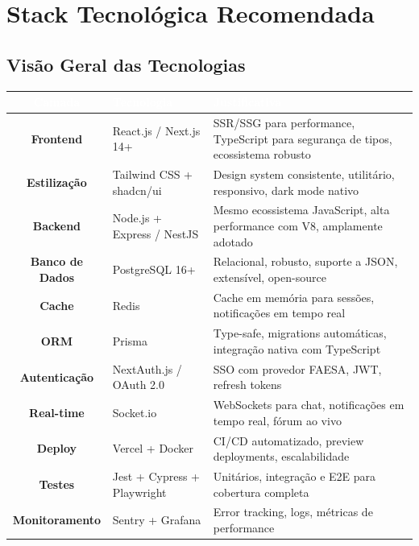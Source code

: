 \documentclass[12pt, a4paper]{article}
\begin{document}
\newpage
\section{Stack Tecnológica Recomendada}

\subsection{Visão Geral das Tecnologias}

\begin{center}
\begin{tabularx}{\textwidth}{|c|X|X|}
\hline
\rowcolor{faesaAzul}
\textcolor{white}{\textbf{Camada}} & \textcolor{white}{\textbf{Tecnologia}} & \textcolor{white}{\textbf{Justificativa}} \\
\hline
\textbf{Frontend} & React.js / Next.js 14+ & SSR/SSG para performance, TypeScript para segurança de tipos, ecossistema robusto \\
\hline
\textbf{Estilização} & Tailwind CSS + shadcn/ui & Design system consistente, utilitário, responsivo, dark mode nativo \\
\hline
\textbf{Backend} & Node.js + Express / NestJS & Mesmo ecossistema JavaScript, alta performance com V8, amplamente adotado \\
\hline
\textbf{Banco de Dados} & PostgreSQL 16+ & Relacional, robusto, suporte a JSON, extensível, open-source \\
\hline
\textbf{Cache} & Redis & Cache em memória para sessões, notificações em tempo real \\
\hline
\textbf{ORM} & Prisma & Type-safe, migrations automáticas, integração nativa com TypeScript \\
\hline
\textbf{Autenticação} & NextAuth.js / OAuth 2.0 & SSO com provedor FAESA, JWT, refresh tokens \\
\hline
\textbf{Real-time} & Socket.io & WebSockets para chat, notificações em tempo real, fórum ao vivo \\
\hline
\textbf{Deploy} & Vercel + Docker & CI/CD automatizado, preview deployments, escalabilidade \\
\hline
\textbf{Testes} & Jest + Cypress + Playwright & Unitários, integração e E2E para cobertura completa \\
\hline
\textbf{Monitoramento} & Sentry + Grafana & Error tracking, logs, métricas de performance \\
\hline
\end{tabularx}
\end{center}
\end{document}
